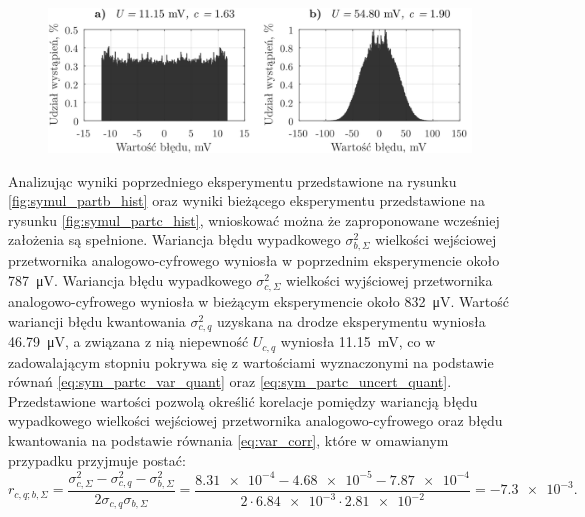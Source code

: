 \begin{figure}[htb!]
\begin{center}
\includegraphics{obrazki/hist_part_c}
\end{center}
\end{figure}

Analizując wyniki poprzedniego eksperymentu przedstawione na rysunku \ref{fig:symul_partb_hist} oraz wyniki bieżącego eksperymentu przedstawione na rysunku \ref{fig:symul_partc_hist}, wnioskować można że zaproponowane wcześniej założenia są spełnione. Wariancja błędu wypadkowego $\sigma_{b,\Sigma}^{2}$ wielkości wejściowej przetwornika analogowo-cyfrowego wyniosła w poprzednim eksperymencie około \qty{787}{\micro V}. Wariancja błędu wypadkowego $\sigma_{c,\Sigma}^{2}$ wielkości wyjściowej przetwornika analogowo-cyfrowego wyniosła w bieżącym eksperymencie około \qty{832}{\micro V}. Wartość wariancji błędu kwantowania $\sigma_{c,q}^{2}$ uzyskana na drodze eksperymentu wyniosła \qty{46.79}{\micro V}, a związana z nią niepewność $U_{c,q}$ wyniosła \qty{11.15}{mV}, co w zadowalającym stopniu pokrywa się z wartościami wyznaczonymi na podstawie równań \eqref{eq:sym_partc_var_quant} oraz \eqref{eq:sym_partc_uncert_quant}. Przedstawione wartości pozwolą określić korelacje pomiędzy wariancją błędu wypadkowego wielkości wejściowej przetwornika analogowo-cyfrowego oraz błędu kwantowania na podstawie równania \eqref{eq:var_corr}, które w omawianym przypadku przyjmuje postać:
\begin{equation}
r_{c,q;b,\Sigma} = \frac{\sigma_{c,\Sigma}^{2} - \sigma_{c,q}^{2} - \sigma_{b,\Sigma}^{2}}{2 \sigma_{c,q} \sigma_{b,\Sigma}} = \frac{\num{8.31e-4} - \num{4.68e-5} - \num{7.87e-4}}{2 \cdot \num{6.84e-3} \cdot \num{2.81e-2}} = \num{-7.3e-3} \label{eq:sym_partc_corr}.
\end{equation}

